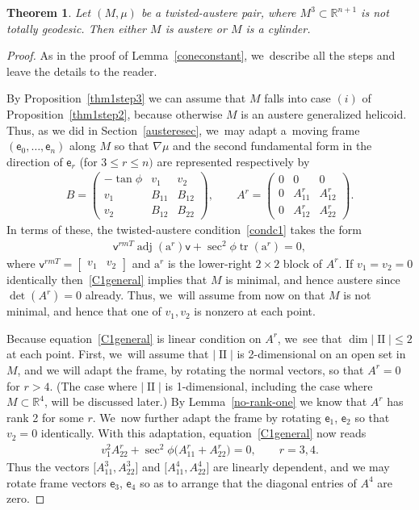 \documentclass[pdftex]{sigma}
\def\R{\mathbb{R}}
\def\ve{\mathsf{e}}
\def\vv{\mathsf{v}}
\def\ba{\boldsymbol{\mathrm{a}}}
\def\adj{\operatorname{adj}}
\def\II{\operatorname{II}} %
\def\tr{\operatorname{tr}}
\newtheorem{Theorem}{Theorem}[section]
\numberwithin{equation}{section}
\begin{document}
\begin{Theorem} \label{thm:class}
Let $(M,\mu)$ be a twisted-austere pair, where $M^3 \subset \R^{n+1}$ is not totally geodesic. Then either $M$ is austere or $M$ is a cylinder.
\end{Theorem}
\begin{proof}
As in the proof of Lemma~\ref{coneconstant}, we~describe all the steps and leave the details to the reader.

By Proposition~\ref{thm1step3} we can assume that $M$ falls into case $(i)$ of Proposition~\ref{thm1step2}, because otherwise $M$ is an austere generalized helicoid. Thus, as we did in Section~\ref{austeresec}, we~may adapt a~moving frame $(\ve_0, \dots, \ve_n)$ along $M$ so that $\nabla \mu$ and the second fundamental form in the direction of $\ve_r$ (for $3 \le r\le n)$ are represented respectively by
\begin{gather*} %
B= \begin{pmatrix} -\tan\phi & v_1 & v_2 \\ v_1 & B_{11} & B_{12} \\ v_2 & B_{12} & B_{22} \end{pmatrix} ,
\qquad
A^r = \begin{pmatrix} 0 & 0 & 0 \\ 0 & A^r_{11} & A^r_{12} \\ 0 & A^r_{12} & A^r_{22}
\end{pmatrix} .
\end{gather*}
In terms of these, the twisted-austere condition~\eqref{condc1} takes the form
\begin{gather} \label{C1general}
\vv^{rm T} \adj(\ba^r) \vv + \sec^2\phi \tr(\ba^r) = 0,
\end{gather}
where $\vv^{rm T} = \begin{bmatrix} v_1 & v_2 \end{bmatrix}$ and $\ba^r$ is the lower-right $2\times 2$ block of $A^r$. If $v_1=v_2=0$ identically then~\eqref{C1general} implies that $M$ is minimal, and hence austere since $\det(A^r)=0$ already. Thus, we~will assume from now on that $M$ is not minimal, and hence that one of $v_1, v_2$ is nonzero at each point.

Because equation~\eqref{C1general} is linear condition on $A^r$, we~see that $\dim |\II| \le 2$ at each point. First, we~will assume that $|\II|$ is 2-dimensional on an open set in $M$, and we will adapt the frame, by rotating the normal vectors, so that $A^r=0$ for $r>4$. (The case where $|\II|$ is 1-dimensional, including the case where $M\subset \R^4$, will be discussed later.) By Lemma~\ref{no-rank-one} we know that $A^r$ has rank 2 for some $r$. We~now further adapt the frame by rotating $\ve_1$, $\ve_2$ so that $v_2=0$ identically. With this adaptation, equation~\eqref{C1general} now reads
\begin{gather*}
v_1^2 A^r_{22} + \sec^2\phi \big(A^r_{11} + A^r_{22}\big)=0,\qquad r=3,4.
\end{gather*}
Thus the vectors $\big[A^3_{11}, A^3_{22}\big]$ and $\big[A^4_{11}, A^4_{22}\big]$ are linearly dependent, and we may rotate frame vectors $\ve_3$, $\ve_4$ so as to arrange that the diagonal entries of $A^4$ are zero.


\end{proof}
\end{document}
